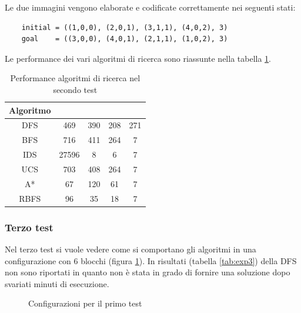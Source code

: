 \documentclass{article}
\begin{document}
	Le due immagini vengono elaborate e codificate correttamente nei seguenti stati:
	\begin{verbatim}
	initial = ((1,0,0), (2,0,1), (3,1,1), (4,0,2), 3)
	goal    = ((3,0,0), (4,0,1), (2,1,1), (1,0,2), 3)
	\end{verbatim}
	Le performance dei vari algoritmi di ricerca sono riassunte nella tabella \ref{tab:exp2}.
	\begin{table}[H]
		\centering
		\def\arraystretch{1.5}
		\begin{tabular}{|c|c|c|c|c|}
			\hline
			\textbf{Algoritmo} & \bm{$n$} & \bm{$m$} & \bm{$\mu$} & \bm{$l$} \\
			\hline
			DFS & 469 & 390 & 208 & 271 \\
			\hline
			BFS &  716 & 411 & 264 & 7 \\
			\hline
			IDS &  27596 & 8 & 6 & 7 \\
			\hline
			UCS &  703 & 408 & 264 & 7 \\
			\hline
			A* &  67 & 120 & 61 & 7 \\
			\hline
			RBFS &  96 & 35 & 18 & 7 \\
			\hline
			
		\end{tabular}
		\caption{Performance algoritmi di ricerca nel secondo test}
		\label{tab:exp2}
	\end{table}
	
	
	\subsubsection{Terzo test}
	Nel terzo test si vuole vedere come si comportano gli algoritmi in una configurazione con 6 blocchi (figura \ref{fig:exp3}). In risultati (tabella \ref{tab:exp3}) della DFS  non sono riportati in quanto non è stata in grado di fornire una soluzione dopo svariati minuti di esecuzione.
	\begin{figure}[H]
		\centering
		\protect\caption{Configurazioni per il primo test}
		\label{fig:exp3}
	\end{figure}
	
\end{document}
